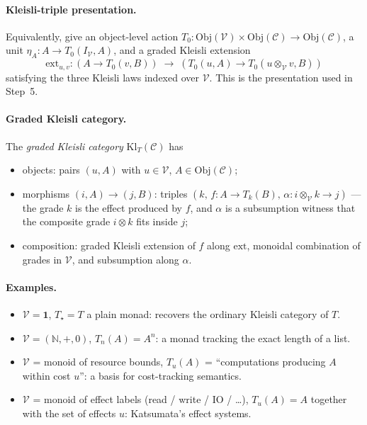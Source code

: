 \documentclass[11pt]{article}
\newcommand{\Obj}{\mathrm{Obj}}
\begin{document}
\paragraph{Kleisli-triple presentation.}
Equivalently, give an object-level action
$T_0 : \Obj(\mathcal{V}) \times \Obj(\mathcal{C}) \to \Obj(\mathcal{C})$,
a unit $\eta_A : A \to T_0(I_\mathcal{V}, A)$, and a graded Kleisli
extension
\[
  \mathrm{ext}_{u,v} :
    (A \to T_0(v, B)) \;\longrightarrow\;
    (T_0(u, A) \to T_0(u \otimes_\mathcal{V} v, B))
\]
satisfying the three Kleisli laws indexed over $\mathcal{V}$.  This
is the presentation used in Step~5.

\paragraph{Graded Kleisli category.}
The \emph{graded Kleisli category} $\mathrm{Kl}_T(\mathcal{C})$ has
\begin{itemize}
  \item objects: pairs $(u, A)$ with $u \in \mathcal{V}$,
        $A \in \Obj(\mathcal{C})$;
  \item morphisms $(i, A) \to (j, B)$: triples $(k,\,
        f : A \to T_k(B),\, \alpha : i \otimes_\mathcal{V} k \to j)$
        --- the grade $k$ is the effect produced by $f$, and
        $\alpha$ is a subsumption witness that the composite grade
        $i \otimes k$ fits inside $j$;
  \item composition: graded Kleisli extension of $f$ along
        $\mathrm{ext}$, monoidal combination of grades in
        $\mathcal{V}$, and subsumption along $\alpha$.
\end{itemize}

\paragraph{Examples.}
\begin{itemize}
  \item $\mathcal{V} = \mathbf{1}$, $T_\star = T$ a plain monad:
        recovers the ordinary Kleisli category of $T$.
  \item $\mathcal{V} = (\mathbb{N}, +, 0)$, $T_n(A) = A^n$:
        a monad tracking the exact length of a list.
  \item $\mathcal{V}$ = monoid of resource bounds, $T_u(A)$ =
        ``computations producing $A$ within cost $u$'':
        a basis for cost-tracking semantics.
  \item $\mathcal{V}$ = monoid of effect labels (read / write /
        IO / \ldots),
        $T_u(A) = A$ together with the set of effects $u$:
        Katsumata's effect systems.
\end{itemize}
\end{document}
